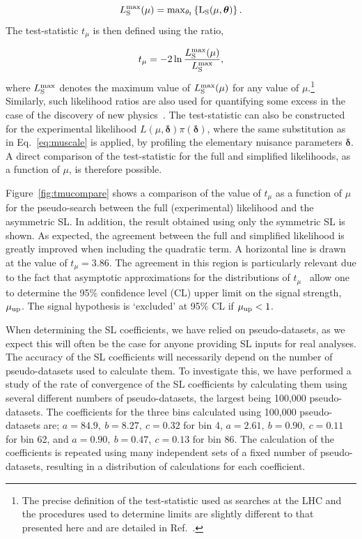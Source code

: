 \documentclass[11pt]{article}
\begin{document}
\begin{equation}
L_{\rm{S}}^{\rm{max}}(\mu) = \rm{max}_{\theta_{I}}\left\{ L_{\rm{S}}(\mu,\bm{\theta}) \right\}.
\end{equation}
The test-statistic $t_{\mu}$ is then defined using the ratio,

\begin{equation}
t_{\mu} = -2\ln \frac{L_{\rm{S}}^{\rm{max}}(\mu)}{L_{\rm{S}}^{\rm{max}}},
\end{equation}
where $L_{\rm{S}}^{\rm{max}}$ denotes the maximum value of $L_{\rm{S}}^{\rm{max}}(\mu)$ for any value of $\mu$.\footnote{The precise definition of the test-statistic used
as searches at the LHC and the procedures used to determine limits are slightly different to that presented here and are detailed in Ref.~\cite{CMS-NOTE-2011-005}.}
Similarly, such likelihood ratios are also used for quantifying some excess in the case of the discovery
of new physics~\cite{CMS-NOTE-2011-005}.
The test-statistic can also be constructed for the experimental likelihood $L(\mu,\bm{\delta})\pi(\bm{\delta})$, where the same substitution as in Eq.~\eqref{eq:muscale} is applied,
by profiling the elementary
nuisance parameters $\bm{\delta}$. A direct comparison of the test-statistic for the full and simplified likelihoods, as a function of $\mu$, 
is therefore possible.


Figure~\ref{fig:tmucompare} shows a comparison of the value of $t_{\mu}$ as a function of $\mu$ for the pseudo-search between the full (experimental)
likelihood and the asymmetric SL. In addition, the result obtained using only the symmetric SL is shown. As expected, the
agreement between the full and simplified likelihood is greatly improved when including the quadratic term. A horizontal line is drawn at the value of
$t_{\mu}= 3.86$. The agreement in this region is particularly relevant due to the fact that asymptotic approximations for the distributions of $t_{\mu}$~\cite{Cowan:2010js} allow one to determine the 95\% confidence level (CL) upper limit on the signal strength, $\mu_{\rm{up}}$.
The signal hypothesis is `excluded' at 95\% CL if $\mu_{\rm{up}} < 1$.


When determining the SL coefficients, we have relied on pseudo-datasets, as we expect this will often be the case for anyone providing SL 
inputs for real analyses. The accuracy of the SL coefficients will necessarily depend on the number of pseudo-datasets used to calculate them. 
To investigate this, we have performed a study of the rate of convergence of the SL coefficients by calculating them using several different 
numbers of pseudo-datasets, the largest being 100,000 pseudo-datasets.  
The coefficients for the three bins calculated using 100,000 pseudo-datasets are; $a=84.9,~b=8.27,~c=0.32$ for bin 4, 
$a=2.61,~b=0.90,~c=0.11$ for bin 62, and $a=0.90,~b=0.47,~c=0.13$ for bin 86. 
The calculation of the coefficients is repeated using many independent sets of a fixed number of pseudo-datasets, resulting in a distribution of 
calculations for each coefficient. 
\end{document}
